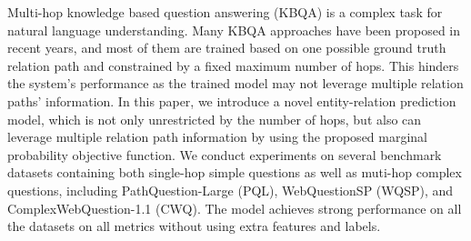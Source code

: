 Multi-hop knowledge based question answering (KBQA) is a complex task for natural language understanding. Many KBQA approaches have been proposed in recent years, and most of them are trained based on one possible ground truth relation path and constrained by a fixed maximum number of hops. This hinders the system's performance as the trained model may not leverage multiple relation paths' information. In this paper, we introduce a novel entity-relation prediction model, which is not only unrestricted by the number of hops, but also can leverage multiple relation path information by using the proposed marginal probability objective function. We conduct experiments on several benchmark datasets containing both single-hop simple questions as well as muti-hop complex questions, including PathQuestion-Large (PQL), WebQuestionSP (WQSP), and ComplexWebQuestion-1.1 (CWQ). The model achieves strong performance on all the datasets on all metrics without using extra features and labels.